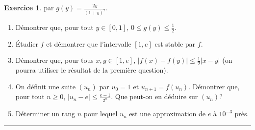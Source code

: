 \documentclass[a4paper,11pt]{article}
\theoremstyle{definition}
\newtheorem{exo}{Exercice} %
\begin{document}
\begin{minipage}{1\linewidth}
\begin{minipage}[t]{0.48\linewidth}
\begin{exo}
			 par $g(y)=\frac{2y}{(1+y)^2}$. 
			\begin{enumerate}
				\item Démontrer que, pour tout $y\in [0,1]$, $0\leq g(y)\leq \frac{1}2$. 
				\item \'Etudier $f$ et démontrer que l'intervalle $[1,e]$ est stable par $f$. 
				\item Démontrer que, pour tous $x,y\in [1,e]$, $|f(x)-f(y)|\leq \frac 12|x-y|$ (on pourra utiliser le résultat de la première question).
				\item On définit une suite $(u_n)$ par $u_0=1$ et $u_{n+1}=f(u_n)$. Démontrer que, pour tout 
				$n\geq 0$, $|u_n-e|\leq\frac{e-1}{2^n}$. Que peut-on en déduire sur $(u_n)$?
				\item Déterminer un rang $n$ pour lequel $u_n$ est une approximation de $e$ à $10^{-3}$ près.
			\end{enumerate}
			
			
			\centering
			\rule{1\linewidth}{0.6pt}
		\end{exo}

		
		
	\end{minipage}
\end{minipage}
\end{document}

